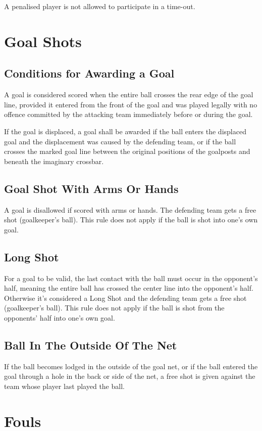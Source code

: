 A penalised player is not allowed to participate in a time-out.

\section{Goal Shots}
\subsection{Conditions for Awarding a Goal}
A goal is considered scored when the entire ball crosses the rear edge of the goal line, provided it entered from the front of the goal and was played legally with no offence committed by the attacking team immediately before or during the goal.

If the goal is displaced, a goal shall be awarded if the ball enters the displaced goal and the displacement was caused by the defending team, or if the ball crosses the marked goal line between the original positions of the goalposts and beneath the imaginary crossbar.

\subsection{Goal Shot With Arms Or Hands \label{subsec:hockey_goal-shots_with-arms-or-hands}}
A goal is disallowed if scored with arms or hands.
The defending team gets a free shot (goalkeeper's ball).
This rule does not apply if the ball is shot into one's own goal.

\subsection{Long Shot}
For a goal to be valid, the last contact with the ball must occur in the opponent’s half, meaning the entire ball has crossed the center line into the opponent’s half.
Otherwise it's considered a Long Shot and the  defending team gets a free shot (goalkeeper's ball).
This rule does not apply if the ball is shot from the opponents' half into one's own goal.

\subsection{Ball In The Outside Of The Net}
If the ball becomes lodged in the outside of the goal net, or if the ball entered the goal through a hole in the back or side of the net, a free shot is given against the team whose player last played the ball.

\section{Fouls}
